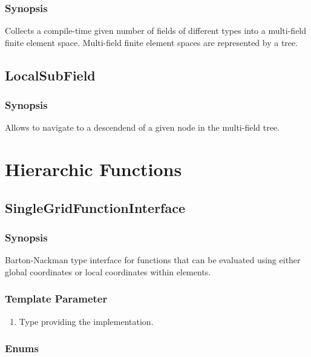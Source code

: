 \documentclass[11pt,a4paper,DIV11,%
notitlepage,oneside,abstracton,%
bibtotoc]{scrartcl}
\begin{document}
\subsubsection{Synopsis}

Collects a compile-time given number of fields of different types into
a multi-field finite element space. 
Multi-field finite element spaces are represented by a tree.


\subsection{LocalSubField}

\subsubsection{Synopsis}

Allows to navigate to a descendend of a given node in the multi-field
tree.

\section{Hierarchic Functions}

\subsection{SingleGridFunctionInterface}

\subsubsection{Synopsis}

Barton-Nackman type interface for
functions that can be evaluated using either global coordinates
or local coordinates within elements.

\subsubsection{Template Parameter}

\begin{enumerate}[1)]
\item Type providing the implementation.
\end{enumerate}

\subsubsection{Enums}
\end{document}
